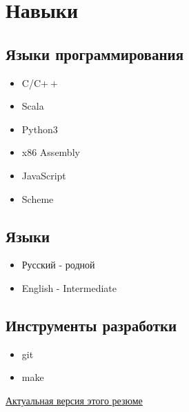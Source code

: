 \documentclass{article}
\begin{document}
    \section{Навыки}
        \begin{multicols}{2}
            \subsection{Языки программирования}
                \begin{itemize}
                    \item C/C$\boldsymbol{++}$
                    \item Scala
                    \item Python3
                    \item x86 Assembly
                    \item JavaScript
                    \item Scheme
                \end{itemize}
            \subsection{Языки}
                \begin{itemize}
                    \item Русский - родной
                    \item English - Intermediate
                \end{itemize}
            \subsection{Инструменты разработки}
                \begin{itemize}
                    \item git
                    \item make
                \end{itemize}
        \end{multicols}
        
    \vspace{\fill}
    \begin{center}
        \large
        \href {https://github.com/InversionSpaces/resume}{Актуальная версия этого резюме}
    \end{center}
\end{document}
